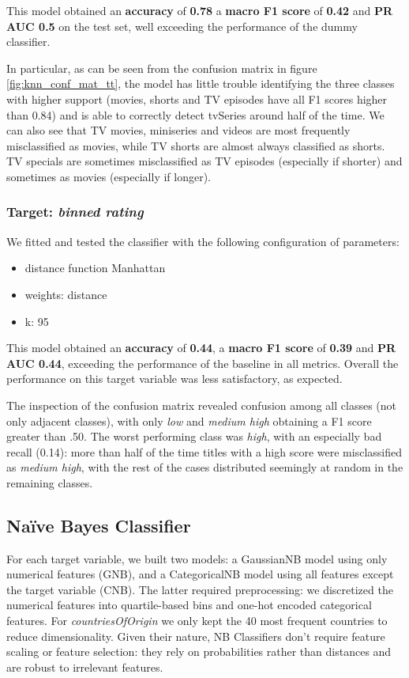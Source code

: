 This model obtained an \textbf{accuracy} of \textbf{0.78} a \textbf{macro F1 score} of \textbf{0.42} and \textbf{PR AUC 0.5} on the test set, well exceeding the performance of the dummy classifier.

In particular, as can be seen from the confusion matrix in figure \ref{fig:knn_conf_mat_tt}, the model has little trouble identifying the three classes with higher support (movies, shorts and TV episodes have all F1 scores higher than 0.84) and is able to correctly detect tvSeries around half of the time.
We can also see that TV movies, miniseries and videos are most frequently misclassified as movies, while TV shorts are almost always classified as shorts.
TV specials are sometimes misclassified as TV episodes (especially if shorter) and sometimes as movies (especially if longer).

\subsubsection{Target: \emph{binned rating}}
We fitted and tested the classifier with the following configuration of parameters:
\begin{itemize}
    \item distance function Manhattan
    \item weights: distance
    \item k: 95
\end{itemize}

This model obtained an \textbf{accuracy} of \textbf{0.44}, a \textbf{macro F1 score} of \textbf{0.39} and \textbf{PR AUC 0.44}, exceeding the performance of the baseline in all metrics.
Overall the performance on this target variable was less satisfactory, as expected.

The inspection of the confusion matrix revealed confusion among all classes (not only adjacent classes), with only \emph{low} and \emph{medium high} obtaining a F1 score greater than .50. The worst performing class was \emph{high}, with an especially bad recall (0.14): more than half of the time titles with a high score were misclassified as \emph{medium high}, with the rest of the cases distributed seemingly at random in the remaining classes.

\subsection{Naïve Bayes Classifier}
\label{naive_bayes}
For each target variable, we built two models: a GaussianNB model using only numerical features (GNB), and a CategoricalNB model using all features except the target variable (CNB). The latter required preprocessing: we discretized the numerical features into quartile-based bins and one-hot encoded categorical features. For \textit{countriesOfOrigin} we only kept the 40 most frequent countries to reduce dimensionality. Given their nature, NB Classifiers don't require feature scaling or feature selection: they rely on probabilities rather than distances and are robust to irrelevant features.

